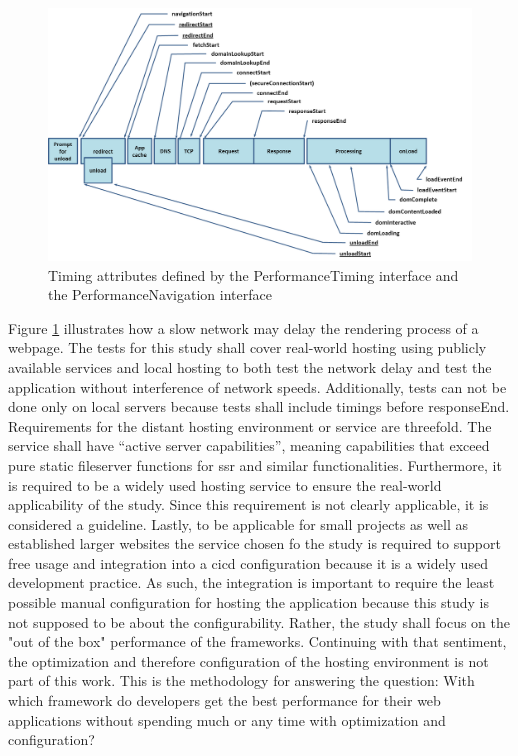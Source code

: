 \documentclass[a4paper, 10pt]{article}
\begin{document}
\begin{figure}
  \begin{center}
    \includegraphics[width=\linewidth]{img/request-timing.png}
  \end{center}
  \caption{Timing attributes defined by the PerformanceTiming interface and the PerformanceNavigation interface \citep{navigationTimings}}\label{fig:timing}
\end{figure}

Figure \ref{fig:timing} illustrates how a slow network may delay the rendering process of a webpage.
The tests for this study shall cover real-world hosting using publicly available services and local hosting to both test the network delay and test the application without interference of network speeds.
Additionally, tests can not be done only on local servers because tests shall include timings before responseEnd.
Requirements for the distant hosting environment or service are threefold.
The service shall have \enquote{active server capabilities}, meaning capabilities that exceed pure static fileserver functions for \acrlong{ssr} and similar functionalities.
Furthermore, it is required to be a widely used hosting service to ensure the real-world applicability of the study.
Since this requirement is not clearly applicable, it is considered a guideline.
Lastly, to be applicable for small projects as well as established larger websites the service chosen fo the study is required to support free usage and integration into a \acrfull{cicd} configuration because it is a widely used development practice. %
As such, the integration is important to require the least possible manual configuration for hosting the application because this study is not supposed to be about the configurability.
Rather, the study shall focus on the "out of the box" performance of the frameworks.
Continuing with that sentiment, the optimization and therefore configuration of the hosting environment is not part of this work.
This is the methodology for answering the question: With which framework do developers get the best performance for their web applications without spending much or any time with optimization and configuration?
\end{document}
